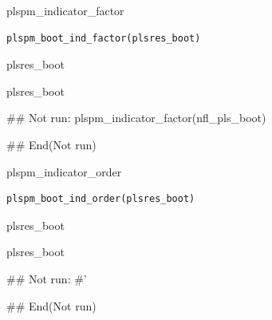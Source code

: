 \documentclass[a4paper]{book}
\begin{document}
%
\begin{Description}
plspm\_indicator\_factor
\end{Description}
%
\begin{Usage}
\begin{verbatim}
plspm_boot_ind_factor(plsres_boot)
\end{verbatim}
\end{Usage}
%
\begin{Arguments}
\begin{ldescription}
\item[\code{plsres\_boot}] plsres\_boot
\end{ldescription}
\end{Arguments}
%
\begin{Value}
plsres\_boot
\end{Value}
%
\begin{Examples}
\begin{ExampleCode}
\#\# Not run: 
plspm_indicator_factor(nfl_pls_boot)

## End(Not run)
\end{ExampleCode}
\end{Examples}

%
\begin{Description}
plspm\_indicator\_order
\end{Description}
%
\begin{Usage}
\begin{verbatim}
plspm_boot_ind_order(plsres_boot)
\end{verbatim}
\end{Usage}
%
\begin{Arguments}
\begin{ldescription}
\item[\code{plsres\_boot}] plsres\_boot
\end{ldescription}
\end{Arguments}
%
\begin{Value}
plsres\_boot
\end{Value}
%
\begin{Examples}
\begin{ExampleCode}
\#\# Not run: 
#'

## End(Not run)

\end{ExampleCode}
\end{Examples}
\end{document}
